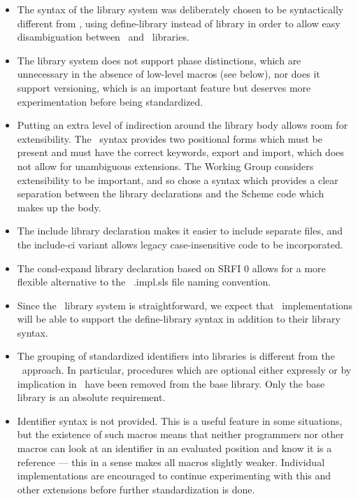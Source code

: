 \begin{itemize}
\item The syntax of the library system was deliberately chosen to be
syntactically different from \rsixrs, using {\cf define-library} instead of
{\cf library} in order to allow easy disambiguation between \rsixrs\
and \rsevenrs\ libraries.

\item The library system does not support phase distinctions, which
are unnecessary in the absence of low-level macros (see below),
nor does it support versioning, which is an important feature but deserves more
experimentation before being standardized.

\item Putting an extra level of indirection around the library body
allows room for extensibility. The \rsixrs\ syntax provides two positional
forms which must be present and must have the correct keywords,
{\cf export} and {\cf import}, which does not allow for unambiguous
extensions. The Working Group considers extensibility to be important,
and so chose a syntax which provides
a clear separation between the library declarations and the Scheme code
which makes up the body.

\item The {\cf include} library declaration
makes it easier to include separate files, 
and the {\cf include-ci} variant allows legacy 
case-insensitive code to be incorporated.

\item The {\cf cond-expand} library declaration based on SRFI 0 allows for a more
flexible alternative to the \rsixrs\ {\cf .impl.sls} file naming
convention.

\item Since the \rsevenrs\ library system is straightforward, we expect
that \rsixrs\ implementations will be able to support the {\cf define-library}
syntax in addition to their {\cf library} syntax.

\item The grouping of standardized identifiers into libraries is different from the \rsixrs\
approach. In particular, procedures which are optional either expressly
or by implication in \rfivers\ have been removed from the base library.
Only the base library is an absolute requirement.

\item Identifier syntax is not provided. This is a useful feature in
some situations, but the existence of such macros means that neither
programmers nor other macros can look at an identifier in an evaluated
position and know it is a reference --- this in a sense makes all macros
slightly weaker. Individual implementations are encouraged to continue
experimenting with this and other extensions before further standardization is done.


\end{itemize}
